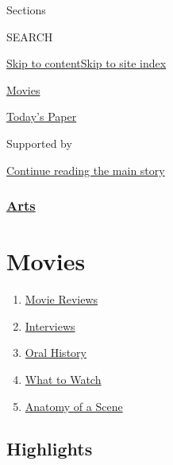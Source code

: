 Sections

SEARCH

\protect\hyperlink{site-content}{Skip to
content}\protect\hyperlink{site-index}{Skip to site index}

\href{https://www.nytimes3xbfgragh.onion/section/movies}{Movies}

\href{https://myaccount.nytimes3xbfgragh.onion/auth/login?response_type=cookie\&client_id=vi}{}

\href{https://www.nytimes3xbfgragh.onion/section/todayspaper}{Today's
Paper}

Supported by

\protect\hyperlink{after-sponsor}{Continue reading the main story}

\hypertarget{arts}{%
\subsubsection{\texorpdfstring{\href{arts}{Arts}}{Arts}}\label{arts}}

\hypertarget{movies}{%
\section{Movies}\label{movies}}

\begin{enumerate}
\def\labelenumi{\arabic{enumi}.}
\tightlist
\item
  \href{/reviews/movies}{Movie Reviews}
\item
  \href{/spotlight/interviews}{Interviews}
\item
  \href{/spotlight/oral-history}{Oral History}
\item
  \href{/spotlight/what-to-watch}{What to Watch}
\item
  \href{/column/anatomy-of-a-scene}{Anatomy of a Scene}
\end{enumerate}

\hypertarget{highlights}{%
\subsection{Highlights}\label{highlights}}

